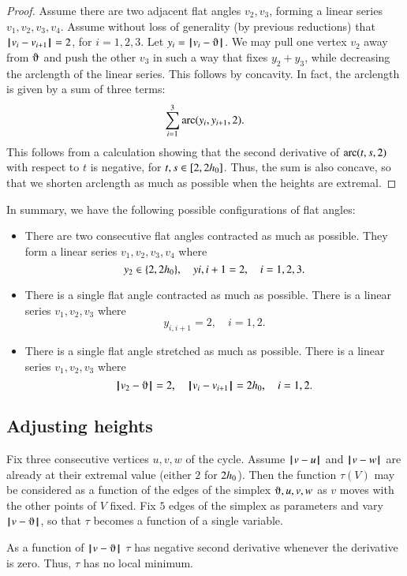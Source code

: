 \begin{proof}
Assume there are two adjacent flat angles $v_2,v_3$, forming a linear series $v_1,v_2,v_3,v_4$.
Assume without loss of generality (by previous reductions) that
${\hskip0.1em|\hskip-0.15em|\hskip0.1em}v_i - v_{i+1}{\hskip0.1em|\hskip-0.15em|\hskip0.1em}=2$, for $i=1,2,3$.
Let $y_i = \norm{v_i}{\orgn}$.
We may pull one vertex $v_2$ away from $\orgn$ and push the other $v_3$ in such a way that fixes $y_2+y_3$, while decreasing the arclength of the linear series.  This follows by concavity.
In fact, the arclength is given by a sum of three terms:
  $$
  \sum_{i=1}^3\operatorname{arc}(y_i,y_{i+1},2).
  $$
This follows from a calculation showing that the second derivative of $\operatorname{arc}(t,s,2)$ with respect to $t$ is negative, for $t,s\in[2,2{h_0}]$.  Thus, the
sum is also concave, so that we shorten arclength as much as possible when the heights are extremal.
\end{proof}

In summary, we have the following possible configurations of flat angles:
\begin{itemize}
\item There are two consecutive flat angles contracted as much as possible.  They form a linear series $v_1,v_2,v_3,v_4$ where
$$
y_2\in\{2,2{h_0}\},\quad
y{i,i+1}=2,\quad i=1,2,3.
$$
\item There is a single flat angle contracted as much as possible.  There
is a linear series $v_1,v_2,v_3$ where
$$
y_{i,i+1}=2,\quad i=1,2.
$$
\item There is a single flat angle stretched as much as possible.  There
is a linear series $v_1,v_2,v_3$ where
$$
\norm{v_2}{\orgn}=2,\quad
\norm{v_i}{v_{i+1}}=2\hm,\quad i=1,2.
$$
\end{itemize}


\subsection{Adjusting heights}

Fix three consecutive vertices $u,v,w$ of the cycle.
Assume ${\hskip0.1em|\hskip-0.15em|\hskip0.1em}v - u{\hskip0.1em|\hskip-0.15em|\hskip0.1em}$ and ${\hskip0.1em|\hskip-0.15em|\hskip0.1em}v - w{\hskip0.1em|\hskip-0.15em|\hskip0.1em}$ are already at their extremal value (either $2$ for  $2{h_0}$).  Then the function $\tau(V)$ may be considered as a function
of the edges of the simplex $\orgn,u,v,w$ as $v$ moves with the other points of $V$ fixed.  Fix $5$ edges of the simplex as parameters and vary $\norm{v}{\orgn}$, so that $\tau$ becomes a function of a single variable.

\begin{lemma} As a function of $\norm{v}{\orgn}$
 $\tau$ has negative second derivative whenever the derivative is zero.  Thus, $\tau$ has no local minimum.
\end{lemma}


